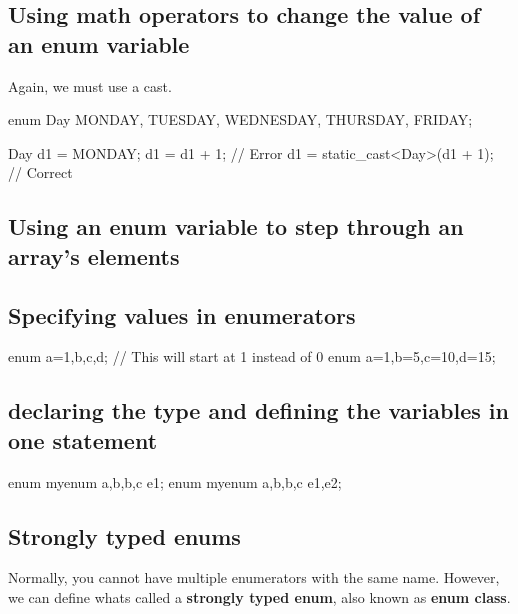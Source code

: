 \documentclass{report}
\begin{document}
    \subsection{Using math operators to change the value of an enum variable}
    \bigbreak \noindent 
    Again, we must use a cast.
    \bigbreak \noindent 
    
    \begin{cppcode}
enum Day { MONDAY, TUESDAY, WEDNESDAY, THURSDAY, FRIDAY};

Day d1 = MONDAY;
d1 = d1 + 1; // Error
d1 = static_cast<Day>(d1 + 1); // Correct
    \end{cppcode}
    

    \bigbreak \noindent 
    \subsection{Using an enum variable to step through an array's elements}
    \bigbreak \noindent 

    \pagebreak \bigbreak \noindent 
    \subsection{Specifying values in enumerators}
    \bigbreak \noindent 
    
    \begin{cppcode}
enum {a=1,b,c,d}; // This will start at 1 instead of 0
enum {a=1,b=5,c=10,d=15}; 
    \end{cppcode}
    
    \bigbreak \noindent 
    \subsection{declaring the type and defining the variables in one statement}
    \bigbreak \noindent 
    
    \begin{cppcode}
enum myenum {a,b,b,c} e1;
enum myenum {a,b,b,c} e1,e2;
    \end{cppcode}
    

    \bigbreak \noindent 
    \subsection{Strongly typed enums}
    \bigbreak \noindent 
    Normally, you cannot have multiple enumerators with the same name. However, we can define whats called a \textbf{strongly typed enum}, also known as \textbf{enum class}.
    \bigbreak \noindent 
    
\end{document}
